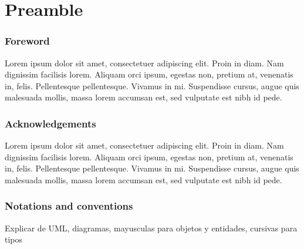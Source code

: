 
\chapter*{Preamble}

\subsection*{Foreword}
Lorem ipsum dolor sit amet, consectetuer adipiscing elit. Proin in diam. Nam dignissim facilisis lorem. Aliquam orci ipsum, egestas non, pretium at, venenatis in, felis. Pellentesque pellentesque. Vivamus in mi. Suspendisse cursus, augue quis malesuada mollis, massa lorem accumsan est, sed vulputate est nibh id pede.

\subsection*{Acknowledgements}
Lorem ipsum dolor sit amet, consectetuer adipiscing elit. Proin in diam. Nam dignissim facilisis lorem. Aliquam orci ipsum, egestas non, pretium at, venenatis in, felis. Pellentesque pellentesque. Vivamus in mi. Suspendisse cursus, augue quis malesuada mollis, massa lorem accumsan est, sed vulputate est nibh id pede.

\subsection*{Notations and conventions}
Explicar de UML, diagramas, mayusculas para objetos y entidades, cursivas para tipos

